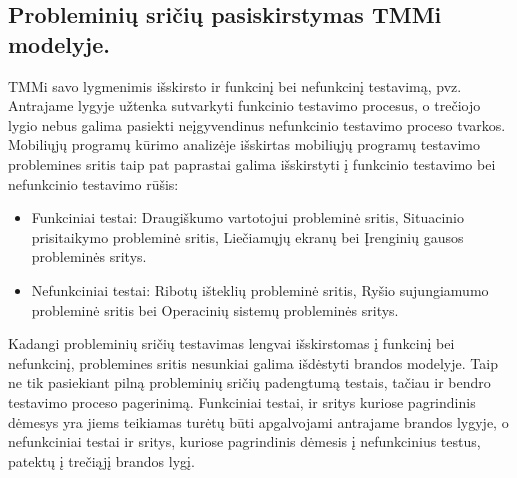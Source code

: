 \documentclass{VUMIFPSkursinis}
\begin{document}
\subsection{Probleminių sričių pasiskirstymas TMMi modelyje.}
TMMi savo lygmenimis išskirsto ir funkcinį bei nefunkcinį testavimą, pvz. Antrajame lygyje užtenka sutvarkyti funkcinio testavimo procesus, o trečiojo lygio nebus galima pasiekti neįgyvendinus nefunkcinio testavimo proceso tvarkos. Mobiliųjų programų kūrimo analizėje išskirtas mobiliųjų programų testavimo problemines sritis taip pat paprastai galima išskirstyti į funkcinio testavimo bei nefunkcinio testavimo rūšis:
\begin{itemize}
   \item Funkciniai testai: Draugiškumo vartotojui probleminė sritis, Situacinio prisitaikymo probleminė sritis, Liečiamųjų ekranų bei Įrenginių gausos probleminės sritys.
   \item Nefunkciniai testai: Ribotų išteklių probleminė sritis, Ryšio sujungiamumo probleminė sritis bei Operacinių sistemų probleminės sritys.
\end{itemize}
\bigskip
Kadangi probleminių sričių testavimas lengvai išskirstomas į funkcinį bei nefunkcinį, problemines sritis nesunkiai galima išdėstyti brandos modelyje. Taip ne tik pasiekiant pilną probleminių sričių padengtumą testais, tačiau ir bendro testavimo proceso pagerinimą. Funkciniai testai, ir sritys kuriose pagrindinis dėmesys yra jiems teikiamas turėtų būti apgalvojami antrajame brandos lygyje, o nefunkciniai testai ir sritys, kuriose pagrindinis dėmesis į nefunkcinius testus, patektų į trečiąjį brandos lygį.
\end{document}
